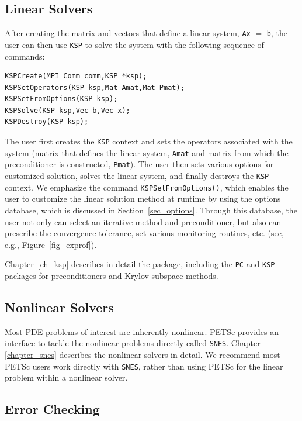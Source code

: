 \subsection*{Linear Solvers}

After creating the matrix and vectors that define a linear system,
\lstinline{Ax} $=$ \lstinline{b}, the user can then use \lstinline{KSP} to solve the system
with the following sequence of commands:
\begin{lstlisting}
KSPCreate(MPI_Comm comm,KSP *ksp); 
KSPSetOperators(KSP ksp,Mat Amat,Mat Pmat);
KSPSetFromOptions(KSP ksp);
KSPSolve(KSP ksp,Vec b,Vec x);
KSPDestroy(KSP ksp);
\end{lstlisting}
The user first creates the \lstinline{KSP} context and sets the operators
associated with the system (matrix that defines the linear system, \lstinline{Amat} and matrix from which the 
preconditioner is constructed, \lstinline{Pmat}).  The user then sets various options for
customized solution, solves the linear system, and finally destroys
the \lstinline{KSP} context.  We emphasize the command \lstinline{KSPSetFromOptions()},
which enables the user to customize the linear solution
method at runtime by using the options database, which is discussed in
Section~\ref{sec_options}. Through this database, the user not only
can select an iterative method and preconditioner, but also can prescribe
the convergence tolerance, set various monitoring routines, etc.
(see, e.g., Figure~\ref{fig_exprof}).

Chapter~\ref{ch_ksp} describes in detail the  package, including
the \lstinline{PC} and \lstinline{KSP} packages for preconditioners and Krylov subspace methods.

\subsection*{Nonlinear Solvers}
Most PDE problems of interest are inherently nonlinear. PETSc provides
an interface to tackle the nonlinear problems directly called \lstinline{SNES}. Chapter
\ref{chapter_snes} describes the nonlinear solvers in detail. We recommend
most PETSc users work directly with \lstinline{SNES}, rather than using PETSc
for the linear problem within a nonlinear solver.

\subsection*{Error Checking}

